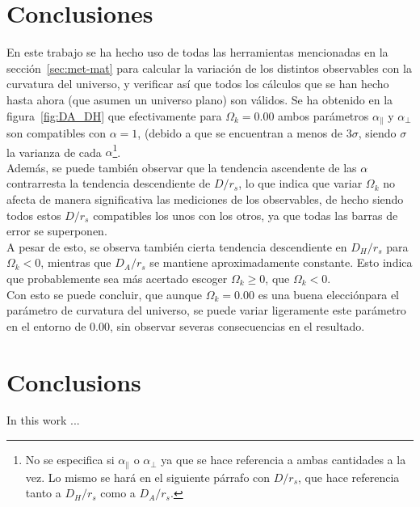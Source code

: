 \chapter*{Conclusiones}

En este trabajo se ha hecho uso de todas las herramientas mencionadas en la sección~\ref{sec:met-mat} para calcular la variación de los distintos observables con la curvatura del universo, y verificar así que todos los cálculos que se han hecho hasta ahora (que asumen un universo plano) son válidos. Se ha obtenido en la figura~\ref{fig:DA_DH} que efectivamente para $\Omega_k=0.00$ ambos parámetros  $\alpha_\parallel$ y $\alpha_\perp$ son compatibles con  $\alpha=1$, (debido a que se encuentran a menos de $3\sigma$, siendo $\sigma$ la varianza de cada $\alpha$\footnote{No se especifica si $\alpha_\parallel$ o $\alpha_\perp$ ya que se hace referencia a ambas cantidades a la vez. Lo mismo se hará en el siguiente párrafo con $D/r_s$, que hace referencia tanto a $D_H /r_s$ como a $D_A/r_s$.}.\\

Además, se puede también observar que la tendencia ascendente de las  $\alpha$ contrarresta la tendencia descendiente de $D /r_s$, lo que indica 	que variar $\Omega_k$ no afecta de manera significativa las mediciones de los observables, de hecho siendo todos estos $D /r_s$ compatibles los unos con los otros, ya que todas las barras de error se superponen.\\

A pesar de esto, se observa también cierta tendencia descendiente en $D_H /r_s$ para $\Omega_k<0$, mientras que $D_A / r_s$ se mantiene aproximadamente constante. Esto indica que probablemente sea más acertado escoger $\Omega_k \ge 0$, que $\Omega_k<0$. \\

Con esto se puede concluir, que aunque $\Omega_k=0.00$ es una buena elecciónpara el parámetro de curvatura del universo, se puede variar ligeramente este parámetro en el entorno de $0.00$, sin observar severas consecuencias en el resultado.


\chapter*{Conclusions}

In this work ...
